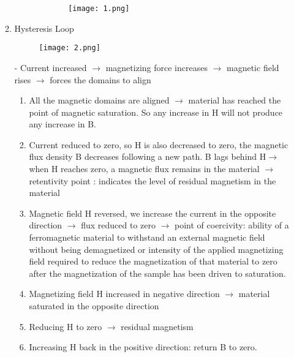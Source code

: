 \begin{enumerate}
\begin{enumerate}
\begin{itemize}
\begin{itemize}
                \begin{figure}[H]
                \centering
                \texttt{[image: 1.png]}
                \caption{}
                \end{figure}
            \end{itemize}
        \end{itemize}
        \item Hysteresis Loop
        \begin{figure}[H]
            \centering
            \texttt{[image: 2.png]}
            \caption{}
        \end{figure}
        -	Current increased $\rightarrow$ magnetizing force increases $\rightarrow$ magnetic field rises $\rightarrow$ forces the domains to align
        \begin{enumerate}
            \item 	All the magnetic domains are aligned $\rightarrow$ material has reached the point of magnetic saturation. So any increase in H will not produce any increase in B.
            \item 	Current reduced to zero, so H is also decreased to zero, the magnetic flux density B decreases following a new path. B lags behind H$\rightarrow$ when H reaches zero, a  magnetic flux remains in the material $\rightarrow$ retentivity point : indicates the level of residual magnetism in the material
            \item 	Magnetic field H reversed, we increase the current in the opposite direction $\rightarrow$ flux reduced to zero $\rightarrow$ point of coercivity: ability of a ferromagnetic material to withstand an external magnetic field without being demagnetized or intensity of the applied magnetizing field required to reduce the magnetization of that material to zero after the magnetization of the sample has been driven to saturation.
            \item 	Magnetizing field H increased in negative direction $\rightarrow$ material saturated in the opposite direction 
            \item 	Reducing H to zero $\rightarrow$ residual magnetism
            \item 	Increasing H back in the positive direction: return B to zero.
            

\end{enumerate}
\end{enumerate}
\end{enumerate}
